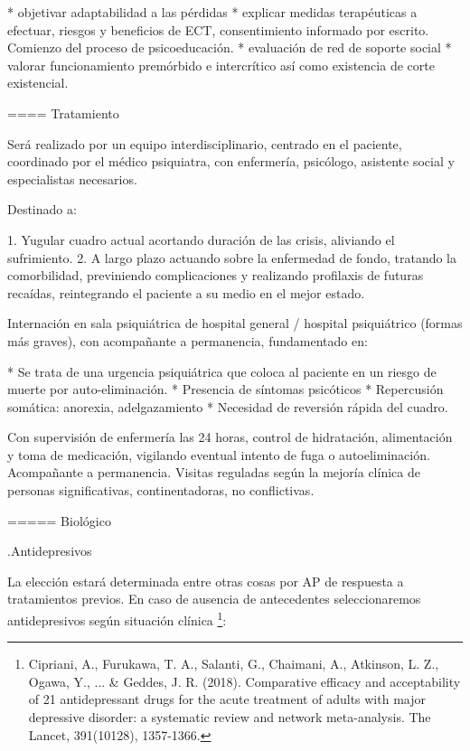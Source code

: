 * objetivar adaptabilidad a las pérdidas
* explicar medidas terapéuticas a efectuar, riesgos y beneficios de ECT, consentimiento informado por escrito. Comienzo del proceso de psicoeducación.
* evaluación de red de soporte social
* valorar funcionamiento premórbido e intercrítico así como existencia de corte existencial.

==== Tratamiento

Será realizado por un equipo interdisciplinario, centrado en el paciente, coordinado por el médico psiquiatra, con enfermería, psicólogo, asistente social y especialistas necesarios.

Destinado a:

1. Yugular cuadro actual acortando duración de las crisis, aliviando el sufrimiento.
2. A largo plazo actuando sobre la enfermedad de fondo, tratando la comorbilidad, previniendo complicaciones y realizando profilaxis de futuras recaídas, reintegrando el paciente a su medio en el mejor estado.

Internación en sala psiquiátrica de hospital general / hospital psiquiátrico (formas más graves), con acompañante a permanencia, fundamentado en:

* Se trata de una urgencia psiquiátrica que coloca al paciente en un riesgo de muerte por auto-eliminación.
* Presencia de síntomas psicóticos
* Repercusión somática: anorexia, adelgazamiento
* Necesidad de reversión rápida del cuadro.

Con supervisión de enfermería las 24 horas, control de hidratación, alimentación y toma de medicación, vigilando eventual intento de fuga o autoeliminación. Acompañante a permanencia. Visitas reguladas según la mejoría clínica de personas significativas, continentadoras, no conflictivas.

===== Biológico

.Antidepresivos

La elección estará determinada entre otras cosas por AP de respuesta a tratamientos previos. En caso de ausencia de antecedentes seleccionaremos antidepresivos según situación clínica \footnote{Cipriani, A., Furukawa, T. A., Salanti, G., Chaimani, A., Atkinson, L. Z., Ogawa, Y., ... \& Geddes, J. R. (2018). Comparative efficacy and acceptability of 21 antidepressant drugs for the acute treatment of adults with major depressive disorder: a systematic review and network meta-analysis. The Lancet, 391(10128), 1357-1366.}:

